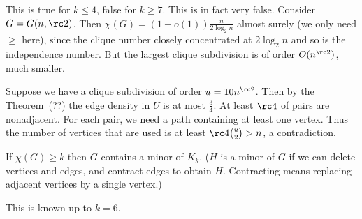 This is true for $k\leq 4$, false for $k\ge 7$. This is in fact very false. Consider $G=G(n,\rc 2)$. Then $\chi(G)=(1+o(1))\frac{n}{2\log_2 n}$ almost surely (we only need $\ge$ here), since the clique number closely concentrated at $2\log_2 n$ and so is the independence number. But the largest clique subdivision is of order $O(n^{\rc 2})$, much smaller.

Suppose we have a clique subdivision of order $u=10n^{\rc 2}$. Then by the Theorem~(??) the edge density in $U$ is at most $\frac 34$. At least $\rc 4$ of pairs are nonadjacent. For each pair, we need a path containing at least one vertex. Thus the number of vertices that are used is at least $\rc 4\binom u2>n$, a contradiction.
\begin{conj}[Hadwiger]
If $\chi(G)\ge k$ then $G$ contains a minor of $K_k$. ($H$ is a minor of $G$ if we can delete vertices and edges, and contract edges to obtain $H$. Contracting means replacing adjacent vertices by a single vertex.)
\end{conj}
This is known up to $k=6$.
